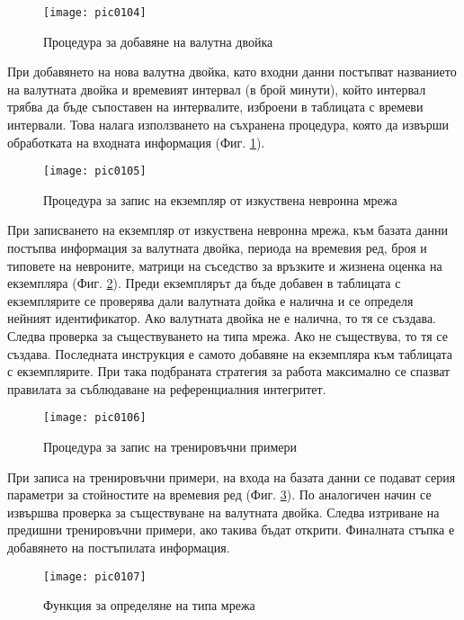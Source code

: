 \begin{figure}[h]
  \centering
  \texttt{[image: pic0104]}
  \caption{Процедура за добавяне на валутна двойка}
\label{fig:pic0104}
\end{figure}
\FloatBarrier

При добавянето на нова валутна двойка, като входни данни постъпват названието на валутната двойка и времевият интервал (в брой минути), който интервал трябва да бъде съпоставен на интервалите, изброени в таблицата с времеви интервали. Това налага използването на съхранена процедура, която да извърши обработката на входната информация (Фиг. \ref{fig:pic0104}). 

\begin{figure}[h]
  \centering
  \texttt{[image: pic0105]}
  \caption{Процедура за запис на екземпляр от изкуствена невронна мрежа}
\label{fig:pic0105}
\end{figure}
\FloatBarrier

При записването на екземпляр от изкуствена невронна мрежа, към базата данни постъпва информация за валутната двойка, периода на времевия ред, броя и типовете на невроните, матрици на съседство за връзките и жизнена оценка на екземпляра (Фиг. \ref{fig:pic0105}). Преди екземплярът да бъде добавен в таблицата с екземплярите се проверява дали валутната дойка е налична и се определя нейният идентификатор. Ако валутната двойка не е налична, то тя се създава. Следва проверка за съществуването на типа мрежа. Ако не съществува, то тя се създава. Последната инструкция е самото добавяне на екземпляра към таблицата с екземплярите. При така подбраната стратегия за работа максимално се спазват правилата за съблюдаване на референциалния интегритет. 

\begin{figure}[h]
  \centering
  \texttt{[image: pic0106]}
  \caption{Процедура за запис на тренировъчни примери}
\label{fig:pic0106}
\end{figure}
\FloatBarrier

При записа на тренировъчни примери, на входа на базата данни се подават серия параметри за стойностите на времевия ред (Фиг. \ref{fig:pic0106}). По аналогичен начин се извършва проверка за съществуване на валутната двойка. Следва изтриване на предишни тренировъчни примери, ако такива бъдат открити. Финалната стъпка е добавянето на постъпилата информация. 

\begin{figure}[h]
  \centering
  \texttt{[image: pic0107]}
  \caption{Функция за определяне на типа мрежа}
\label{fig:pic0107}
\end{figure}
\FloatBarrier

